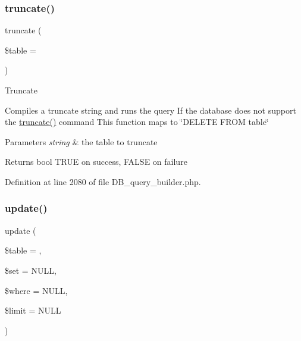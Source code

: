 \mbox{\label{class_c_i___d_b__query__builder_acaa636a6a61d4362c5a32941fc9932ba}} 
\subsubsection{\texorpdfstring{truncate()}{truncate()}}
{\footnotesize\ttfamily truncate (\begin{DoxyParamCaption}\item[{}]{\$table = {\ttfamily \textquotesingle{}\textquotesingle{}} }\end{DoxyParamCaption})}

Truncate

Compiles a truncate string and runs the query If the database does not support the \mbox{\hyperlink{class_c_i___d_b__query__builder_acaa636a6a61d4362c5a32941fc9932ba}{truncate()}} command This function maps to \char`\"{}\+D\+E\+L\+E\+T\+E F\+R\+O\+M table\char`\"{}


\begin{DoxyParams}{Parameters}
{\em string} & the table to truncate \\
\hline
\end{DoxyParams}
\begin{DoxyReturn}{Returns}
bool T\+R\+UE on success, F\+A\+L\+SE on failure 
\end{DoxyReturn}


Definition at line 2080 of file D\+B\+\_\+query\+\_\+builder.\+php.

\mbox{\label{class_c_i___d_b__query__builder_a130a26da2dd4e4582ee18f42d71fe6e4}} 
\subsubsection{\texorpdfstring{update()}{update()}}
{\footnotesize\ttfamily update (\begin{DoxyParamCaption}\item[{}]{\$table = {\ttfamily \textquotesingle{}\textquotesingle{}},  }\item[{}]{\$set = {\ttfamily NULL},  }\item[{}]{\$where = {\ttfamily NULL},  }\item[{}]{\$limit = {\ttfamily NULL} }\end{DoxyParamCaption})}

